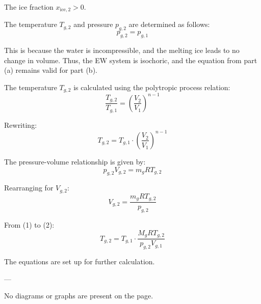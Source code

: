 The ice fraction \( x_{\text{ice},2} > 0 \).  

The temperature \( T_{g,2} \) and pressure \( p_{g,2} \) are determined as follows:  
\[
p_{g,2} = p_{g,1}
\]

This is because the water is incompressible, and the melting ice leads to no change in volume. Thus, the EW system is isochoric, and the equation from part (a) remains valid for part (b).  

The temperature \( T_{g,2} \) is calculated using the polytropic process relation:  
\[
\frac{T_{g,2}}{T_{g,1}} = \left(\frac{V_2}{V_1}\right)^{n-1}
\]

Rewriting:  
\[
T_{g,2} = T_{g,1} \cdot \left(\frac{V_2}{V_1}\right)^{n-1}
\]

The pressure-volume relationship is given by:  
\[
p_{g,2} V_{g,2} = m_g R T_{g,2}
\]

Rearranging for \( V_{g,2} \):  
\[
V_{g,2} = \frac{m_g R T_{g,2}}{p_{g,2}}
\]

From (1) to (2):  
\[
T_{g,2} = T_{g,1} \cdot \frac{M_g R T_{g,2}}{p_{g,2} V_{g,1}}
\]  

The equations are set up for further calculation.  

---

No diagrams or graphs are present on the page.